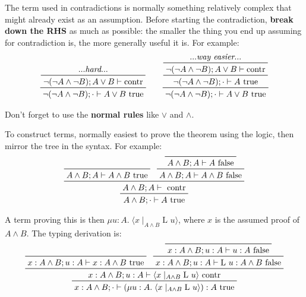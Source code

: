 \documentclass[a4paper,11pt]{article}
\begin{document}
{{        The term used in contradictions is normally something relatively complex that might already exist as an
        assumption. Before starting the contradiction, \textbf{break down the RHS} as much as possible: the smaller the
        thing you end up assuming for contradiction is, the more generally useful it is. For example:
        \begin{gather*}
        \prftree[r]{}
        {
            \prftree[r]{}
            {...\textit{hard}...}
            {\neg(\neg A \wedge \neg B);A \vee B \vdash \text{contr}}
        }
        {\neg(\neg A \wedge \neg B);\cdot \vdash A \vee B\text{ true}}
        \qquad
        \prftree[r]{}
        {
            \prftree[r]{}
            {
                \prftree[r]{}
                {...\textit{way easier}...}
                {\neg(\neg A \wedge \neg B);A \vee B \vdash \text{contr}}
            }
            {\neg(\neg A \wedge \neg B);\cdot \vdash A\text{ true}}
        }
        {\neg(\neg A \wedge \neg B);\cdot \vdash A \vee B\text{ true}}
        \end{gather*}

        Don't forget to use the \textbf{normal rules} like \(\vee\) and \(\wedge\).

        To construct terms, normally easiest to prove the theorem using the logic, then mirror the tree in the syntax.
        For example:
        \begin{equation*}
        \prftree[r]{}
        {
            \prftree[r]{}
            {
                \prfaxiom{A \wedge B;A\vdash A\wedge B\text{ true}}
            }
            {
                \prftree[r]{}
                {
                    \prfaxiom{A \wedge B;A\vdash A\text{ false}}
                }
                {A \wedge B;A\vdash A\wedge B\text{ false}}
            }
            {A \wedge B;A\vdash \text{ contr}}
        }
        { A \wedge B;\cdot \vdash A\text{ true}}
        \end{equation*}

        A term proving this is then \(\mu u:A.\;\langle x \mid_{A \wedge B} \text{L }u \rangle\), where \(x\) is the
        assumed proof of \(A \wedge B\). The typing derivation is:
        \begin{equation*}
        \prftree[r]{}
        {
            \prftree[r]{}
            {
                \prfaxiom{x:A \wedge B;u:A\vdash x: A\wedge B\text{ true}}
            }
            {
                \prftree[r]{}
                {
                    \prfaxiom{x:A \wedge B;u:A\vdash u:A\text{ false}}
                }
                {x:A \wedge B;u:A\vdash \text{L }u : A\wedge B\text{ false}}
            }
            {x:A \wedge B;u:A\vdash \langle x \mid_{A \wedge B} \text{L }u \rangle \text{ contr}}
        }
        {x:A \wedge B;\cdot \vdash (\mu u:A.\;\langle x \mid_{A \wedge B} \text{L }u \rangle) : A\text{ true}}
        \end{equation*}
    }
}
\end{document}
